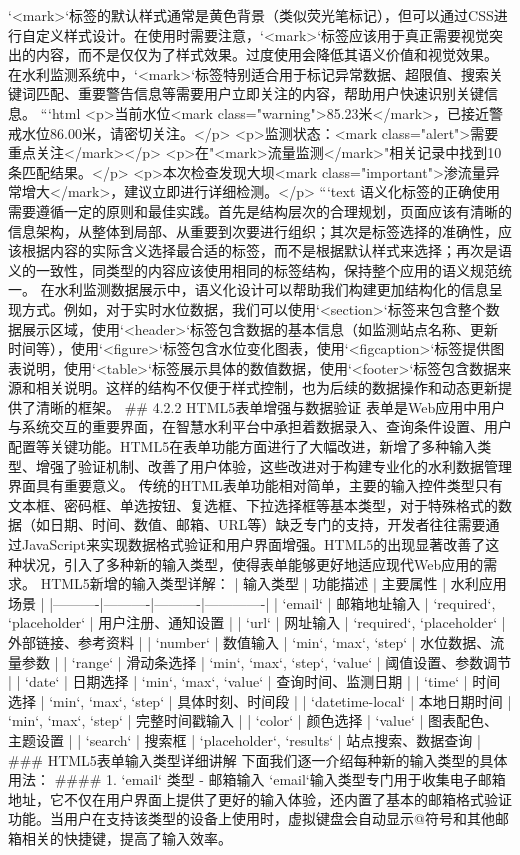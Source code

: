 {{`<mark>`标签的默认样式通常是黄色背景（类似荧光笔标记），但可以通过CSS进行自定义样式设计。在使用时需要注意，`<mark>`标签应该用于真正需要视觉突出的内容，而不是仅仅为了样式效果。过度使用会降低其语义价值和视觉效果。 在水利监测系统中，`<mark>`标签特别适合用于标记异常数据、超限值、搜索关键词匹配、重要警告信息等需要用户立即关注的内容，帮助用户快速识别关键信息。 ```html <p>当前水位<mark class="warning">85.23米</mark>，已接近警戒水位86.00米，请密切关注。</p> <p>监测状态：<mark class="alert">需要重点关注</mark></p> <p>在"<mark>流量监测</mark>"相关记录中找到10条匹配结果。</p> <p>本次检查发现大坝<mark class="important">渗流量异常增大</mark>，建议立即进行详细检测。</p> ```text 语义化标签的正确使用需要遵循一定的原则和最佳实践。首先是结构层次的合理规划，页面应该有清晰的信息架构，从整体到局部、从重要到次要进行组织；其次是标签选择的准确性，应该根据内容的实际含义选择最合适的标签，而不是根据默认样式来选择；再次是语义的一致性，同类型的内容应该使用相同的标签结构，保持整个应用的语义规范统一。 在水利监测数据展示中，语义化设计可以帮助我们构建更加结构化的信息呈现方式。例如，对于实时水位数据，我们可以使用`<section>`标签来包含整个数据展示区域，使用`<header>`标签包含数据的基本信息（如监测站点名称、更新时间等），使用`<figure>`标签包含水位变化图表，使用`<figcaption>`标签提供图表说明，使用`<table>`标签展示具体的数值数据，使用`<footer>`标签包含数据来源和相关说明。这样的结构不仅便于样式控制，也为后续的数据操作和动态更新提供了清晰的框架。 ## 4.2.2 HTML5表单增强与数据验证 表单是Web应用中用户与系统交互的重要界面，在智慧水利平台中承担着数据录入、查询条件设置、用户配置等关键功能。HTML5在表单功能方面进行了大幅改进，新增了多种输入类型、增强了验证机制、改善了用户体验，这些改进对于构建专业化的水利数据管理界面具有重要意义。 传统的HTML表单功能相对简单，主要的输入控件类型只有文本框、密码框、单选按钮、复选框、下拉选择框等基本类型，对于特殊格式的数据（如日期、时间、数值、邮箱、URL等）缺乏专门的支持，开发者往往需要通过JavaScript来实现数据格式验证和用户界面增强。HTML5的出现显著改善了这种状况，引入了多种新的输入类型，使得表单能够更好地适应现代Web应用的需求。 HTML5新增的输入类型详解： | 输入类型 | 功能描述 | 主要属性 | 水利应用场景 | |----------|----------|----------|-------------| | `email` | 邮箱地址输入 | `required`, `placeholder` | 用户注册、通知设置 | | `url` | 网址输入 | `required`, `placeholder` | 外部链接、参考资料 | | `number` | 数值输入 | `min`, `max`, `step` | 水位数据、流量参数 | | `range` | 滑动条选择 | `min`, `max`, `step`, `value` | 阈值设置、参数调节 | | `date` | 日期选择 | `min`, `max`, `value` | 查询时间、监测日期 | | `time` | 时间选择 | `min`, `max`, `step` | 具体时刻、时间段 | | `datetime-local` | 本地日期时间 | `min`, `max`, `step` | 完整时间戳输入 | | `color` | 颜色选择 | `value` | 图表配色、主题设置 | | `search` | 搜索框 | `placeholder`, `results` | 站点搜索、数据查询 | ### HTML5表单输入类型详细讲解 下面我们逐一介绍每种新的输入类型的具体用法： #### 1. `email` 类型 - 邮箱输入 `email`输入类型专门用于收集电子邮箱地址，它不仅在用户界面上提供了更好的输入体验，还内置了基本的邮箱格式验证功能。当用户在支持该类型的设备上使用时，虚拟键盘会自动显示@符号和其他邮箱相关的快捷键，提高了输入效率。 }}
